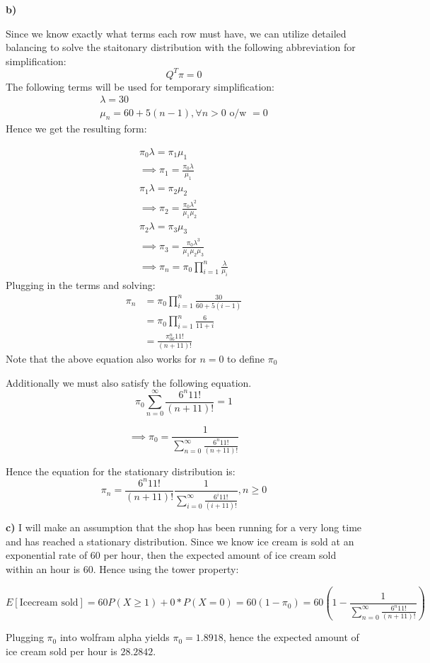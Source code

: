 \documentclass{article}
\begin{document}
\textbf{b)}

Since we know exactly what terms each row must have, we can utilize detailed balancing to solve the 
staitonary distribution with the following abbreviation for simplification:
\[Q^T\pi = 0\]
The following terms will be used for temporary simplification:
\begin{gather*}
\lambda = 30\\ \mu_n = 60 + 5(n-1),\forall n>0\text{ o/w } =0
\end{gather*}
Hence we get the resulting form:

\begin{align*}
    \pi_0\lambda = \pi_1\mu_1\\
    \implies\pi_1 = \frac{\pi_0\lambda}{\mu_1}\\
    \pi_1\lambda = \pi_2\mu_2\\
    \implies \pi_2 = \frac{\pi_0\lambda^2}{\mu_1\mu_2}\\
    \pi_2\lambda = \pi_3\mu_3\\
    \implies \pi_3 = \frac{\pi_0\lambda^3}{\mu_1\mu_2\mu_3}\\
    \implies \pi_n = \pi_0\prod_{i=1}^n \frac{\lambda}{\mu_i}
\end{align*}
Plugging in the terms and solving:
\begin{align*}
    \pi_n &= \pi_0\prod_{i=1}^n \frac{30}{60 +5(i-1)}\\
    &= \pi_0\prod_{i=1}^n \frac{6}{11+i}\\
    &= \frac{\pi_06^n11!}{(n+11)!}
\end{align*}
Note that the above equation also works for $n=0$ to define $\pi_0$

Additionally we must also satisfy the following equation.
\[
\pi_0\sum_{n=0}^\infty \frac{6^n11!}{(n+11)!} = 1
\]

\[
\implies \pi_0 = \frac{1}{\sum_{n=0}^\infty \frac{6^n11!}{(n+11)!}}
\]

Hence the equation for the stationary distribution is:
\[
\pi_n = \frac{6^n11!}{(n+11)!}\frac{1}{\sum_{i=0}^\infty \frac{6^i11!}{(i+11)!}}, n\geq 0
\]

\textbf{c)} 
I will make an assumption that the shop has been running for a very long time and has reached a
stationary distribution. Since we know ice cream is sold at an exponential rate of 60 per hour,
then the expected amount of ice cream sold within an hour is 60. Hence using the tower property:

\[
E[\text{Icecream sold}] = 60P(X\geq 1) + 0 *P(X = 0) = 60(1-\pi_0) = 60\left(1-\frac{1}{\sum_{n=0}^\infty \frac{6^n11!}{(n+11)!}}\right)
\]

Plugging $\pi_0$ into wolfram alpha yields $\pi_0 = 1.8918$, hence the expected amount of ice cream sold per hour is
$28.2842$.
\end{document}
